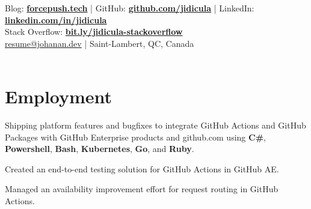 \documentclass[]{jidicula-resume}
\begin{document}
\livelocation\hfill\lastupdated{}

{ Blog: \href{http://bit.ly/jidicula-site}{\bf forcepush.tech}
  | GitHub: \href{http://bit.ly/jidicula_github}{\bf github.com/jidicula} | LinkedIn: \href{https://bit.ly/jidicula-linkedin}{\bf linkedin.com/in/jidicula} \\
  Stack Overflow: \href{https://bit.ly/jidicula-stackoverflow}{\bf bit.ly/jidicula-stackoverflow} \\ \href{mailto:resume@johanan.dev}{resume@johanan.dev}
  | Saint-Lambert, QC, Canada \\~\\
}

\section{Employment}

\vspace{\topsep} %
\begin{tightemize}
\item Shipping platform features and bugfixes to integrate GitHub Actions and GitHub Packages with GitHub Enterprise products and github.com using \textbf{C\#}, \textbf{Powershell}, \textbf{Bash}, \textbf{Kubernetes}, \textbf{Go}, and \textbf{Ruby}.
\item Created an end-to-end testing solution for GitHub Actions in GitHub AE.
\item Managed an availability improvement effort for request routing in GitHub Actions.
\end{tightemize}
\sectionsep{}
\end{document}
